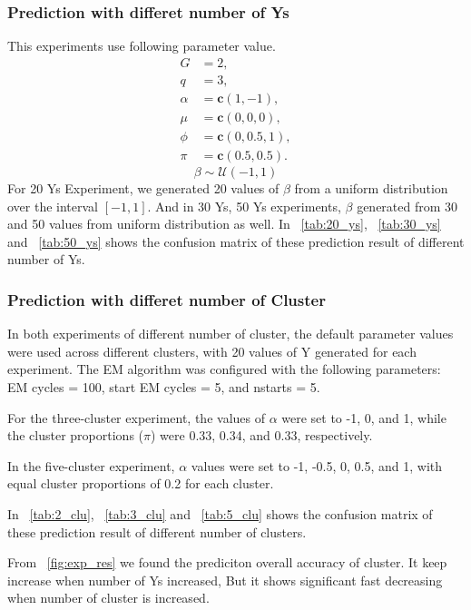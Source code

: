 \documentclass{article}
\begin{document}
\subsubsection*{Prediction with differet number of Ys}

This experiments use following parameter value.
\[
\begin{aligned}
G &= 2, \\
q &= 3, \\
\alpha &= \mathbf{c}(1, -1), \\
\mu &= \mathbf{c}(0, 0, 0), \\
\phi &= \mathbf{c}(0, 0.5, 1), \\
\pi &= \mathbf{c}(0.5, 0.5).
\end{aligned}
\]
\[
\beta \sim \mathcal{U}(-1, 1)
\]
For 20 Ys Experiment, we generated 20 values of $\beta$ from a uniform distribution over the interval $[-1, 1]$.
And in 30 Ys, 50 Ys experiments, $\beta$ generated from 30 and 50 values from uniform distribution as well.
In ~\ref*{tab:20_ys}, ~\ref*{tab:30_ys} and ~\ref*{tab:50_ys} shows the confusion matrix of these prediction result of different number of Ys.

\subsubsection*{Prediction with differet number of Cluster}

In both experiments of different number of cluster, 
the default parameter values were used across different clusters, 
with 20 values of Y generated for each experiment. 
The EM algorithm was configured with the following parameters: EM cycles = 100, start EM cycles = 5, and nstarts = 5.

For the three-cluster experiment, the values of $\alpha$ were set to -1, 0, and 1, 
while the cluster proportions ($\pi$) were 0.33, 0.34, and 0.33, respectively. 

In the five-cluster experiment, $\alpha$ values were set to -1, -0.5, 0, 0.5, and 1, 
with equal cluster proportions of 0.2 for each cluster.

In ~\ref*{tab:2_clu}, ~\ref*{tab:3_clu} and ~\ref*{tab:5_clu} shows the confusion matrix of these prediction result of different number of clusters.

From ~\ref*{fig:exp_res} we found the prediciton overall accuracy of cluster.
It keep increase when number of Ys increased,
But it shows significant fast decreasing when number of cluster is increased.
\end{document}
